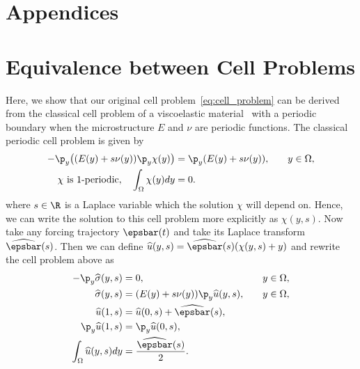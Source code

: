 \documentclass[letterpaper,11pt]{article}
\begin{document}
 


\appendix
{}
\section*{Appendices}

\section{Equivalence between Cell Problems}\label{sec:cell_problem_equiv}



Here, we show that our original cell problem~\eqref{eq:cell_problem} can be derived from the classical cell problem of a viscoelastic material~\cite{bhattacharya2023learning, pavliotis2008multiscale} with a periodic boundary when the microstructure $E$ and $\nu$ are periodic functions. The classical periodic cell problem is given by
\begin{subequations}\label{eq:periodic_cell_problem}
    \begin{align}
        -\p_y\big((E(y) + s\nu(y))\p_y\chi(y)\big) &= \p_y(E(y) + s\nu(y)), &\quad y &\in \Omega, \\
         \chi \text{ is 1-periodic}, \quad \int_{\Omega} \chi(y)dy &= 0.
    \end{align}
\end{subequations}
where $s \in \R$ is a Laplace variable which the solution $\chi$ will depend on. Hence, we can write the solution to this cell problem more explicitly as $\chi(y, s)$. Now take any forcing trajectory $\epsbar(t)$ and take its Laplace transform $\widehat{\epsbar}(s)$. Then we can define $\widehat{u}(y, s) = \widehat{\epsbar}(s)(\chi(y, s) + y)$ and rewrite the cell problem above as
\begin{subequations}
    \begin{align}
        -\p_y\widehat{\sigma}(y, s) &= 0, &\quad y &\in \Omega,\\
        \widehat{\sigma}(y, s) &= (E(y) + s\nu(y))\p_y\widehat{u}(y, s), &\quad y &\in \Omega,\\
        \widehat{u}(1, s) &= \widehat{u}(0, s)+\widehat{\epsbar}(s),\\
        \p_y \widehat{u}(1, s) &= \p_y \widehat{u}(0, s),\\
        \int_{\Omega} \widehat{u}(y, s)dy &= \frac{\widehat{\epsbar}(s)}{2}.
    \end{align}
\end{subequations}
\end{document}
